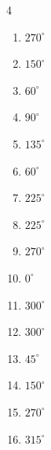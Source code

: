 \begin{multicols}{4}
\begin{enumerate}
  \item $\displaystyle 270^{\circ}$

  \item $\displaystyle 150^{\circ}$

  \item $\displaystyle 60^{\circ}$

  \item $\displaystyle 90^{\circ}$

  \item $\displaystyle 135^{\circ}$

  \item $\displaystyle 60^{\circ}$

  \item $\displaystyle 225^{\circ}$

  \item $\displaystyle 225^{\circ}$

  \item $\displaystyle 270^{\circ}$

  \item $\displaystyle 0^{\circ}$
        \phantom{$\displaystyle =0$}

  \item $\displaystyle 300^{\circ}$

  \item $\displaystyle 300^{\circ}$

  \item $\displaystyle 45^{\circ}$

  \item $\displaystyle 150^{\circ}$

  \item $\displaystyle 270^{\circ}$

\columnbreak %

  \item $\displaystyle 315^{\circ}$


\end{enumerate}
\end{multicols}
